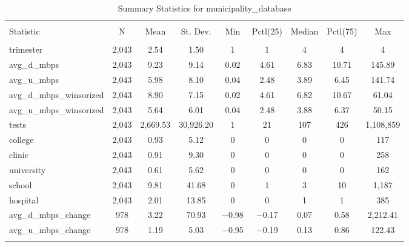 \documentclass{article}
\begin{document}
\begin{table}[!htbp] \centering 
  \caption{Summary Statistics for municipality_database} 
  \label{} 
\begin{tabular}{@{\extracolsep{5pt}}lcccccccc} 
\\[-1.8ex]\hline 
\hline \\[-1.8ex] 
Statistic & \multicolumn{1}{c}{N} & \multicolumn{1}{c}{Mean} & \multicolumn{1}{c}{St. Dev.} & \multicolumn{1}{c}{Min} & \multicolumn{1}{c}{Pctl(25)} & \multicolumn{1}{c}{Median} & \multicolumn{1}{c}{Pctl(75)} & \multicolumn{1}{c}{Max} \\ 
\hline \\[-1.8ex] 
trimester & 2,043 & 2.54 & 1.50 & 1 & 1 & 4 & 4 & 4 \\ 
avg\_d\_mbps & 2,043 & 9.23 & 9.14 & 0.02 & 4.61 & 6.83 & 10.71 & 145.89 \\ 
avg\_u\_mbps & 2,043 & 5.98 & 8.10 & 0.04 & 2.48 & 3.89 & 6.45 & 141.74 \\ 
avg\_d\_mbps\_winsorized & 2,043 & 8.90 & 7.15 & 0.02 & 4.61 & 6.82 & 10.67 & 61.04 \\ 
avg\_u\_mbps\_winsorized & 2,043 & 5.64 & 6.01 & 0.04 & 2.48 & 3.88 & 6.37 & 50.15 \\ 
tests & 2,043 & 2,669.53 & 30,926.20 & 1 & 21 & 107 & 426 & 1,108,859 \\ 
college & 2,043 & 0.93 & 5.12 & 0 & 0 & 0 & 0 & 117 \\ 
clinic & 2,043 & 0.91 & 9.30 & 0 & 0 & 0 & 0 & 258 \\ 
university & 2,043 & 0.61 & 5.62 & 0 & 0 & 0 & 0 & 162 \\ 
school & 2,043 & 9.81 & 41.68 & 0 & 1 & 3 & 10 & 1,187 \\ 
hospital & 2,043 & 2.01 & 13.85 & 0 & 0 & 1 & 1 & 385 \\ 
avg\_d\_mbps\_change & 978 & 3.22 & 70.93 & $-$0.98 & $-$0.17 & 0.07 & 0.58 & 2,212.41 \\ 
avg\_u\_mbps\_change & 978 & 1.19 & 5.03 & $-$0.95 & $-$0.19 & 0.13 & 0.86 & 122.43 \\ 
\hline \\[-1.8ex] 
\end{tabular} 
\end{table} 
\end{document}
